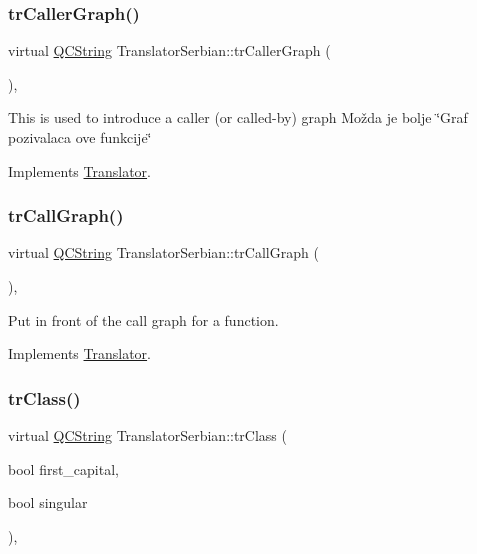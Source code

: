 \subsubsection{\texorpdfstring{trCallerGraph()}{trCallerGraph()}}
{\footnotesize\ttfamily virtual \mbox{\hyperlink{class_q_c_string}{Q\+C\+String}} Translator\+Serbian\+::tr\+Caller\+Graph (\begin{DoxyParamCaption}{ }\end{DoxyParamCaption})\hspace{0.3cm}{\ttfamily [inline]}, {\ttfamily [virtual]}}

This is used to introduce a caller (or called-\/by) graph Možda je bolje \char`\"{}\+Graf pozivalaca ove funkcije\char`\"{}

Implements \mbox{\hyperlink{class_translator}{Translator}}.

\mbox{\label{class_translator_serbian_a450809b8918f60c955940c537db866c8}} 
\subsubsection{\texorpdfstring{trCallGraph()}{trCallGraph()}}
{\footnotesize\ttfamily virtual \mbox{\hyperlink{class_q_c_string}{Q\+C\+String}} Translator\+Serbian\+::tr\+Call\+Graph (\begin{DoxyParamCaption}{ }\end{DoxyParamCaption})\hspace{0.3cm}{\ttfamily [inline]}, {\ttfamily [virtual]}}

Put in front of the call graph for a function. 

Implements \mbox{\hyperlink{class_translator}{Translator}}.

\mbox{\label{class_translator_serbian_a2d18b40458012ab26436f1eb0bd02bc9}} 
\subsubsection{\texorpdfstring{trClass()}{trClass()}}
{\footnotesize\ttfamily virtual \mbox{\hyperlink{class_q_c_string}{Q\+C\+String}} Translator\+Serbian\+::tr\+Class (\begin{DoxyParamCaption}\item[{bool}]{first\+\_\+capital,  }\item[{bool}]{singular }\end{DoxyParamCaption})\hspace{0.3cm}{\ttfamily [inline]}, {\ttfamily [virtual]}}

